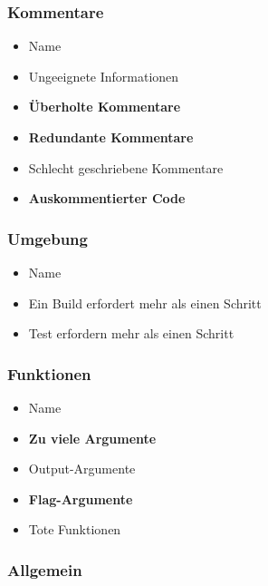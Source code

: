 \subsubsection{Kommentare}
\begin{itemize}
	\item Name
	\item Ungeeignete Informationen
	\item \textbf{Überholte Kommentare} 
	\item \textbf{Redundante Kommentare}
	\item Schlecht geschriebene Kommentare  
	\item \textbf{Auskommentierter Code}
\end{itemize}

\subsubsection{Umgebung}
\begin{itemize}
	\item Name
	\item Ein Build erfordert mehr als einen Schritt 
	\item Test erfordern mehr als einen Schritt 
\end{itemize}

\subsubsection{Funktionen}

\begin{itemize}
	\item Name 
	\item \textbf{Zu viele Argumente}
	\item Output-Argumente 
	\item \textbf{Flag-Argumente}
	\item Tote Funktionen 
\end{itemize}

\subsubsection{Allgemein}

